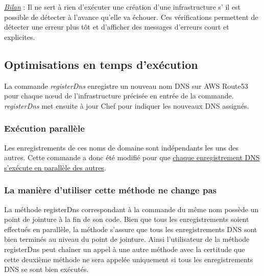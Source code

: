 \underline{\textit{Bilan}} :  Il ne sert à rien d'exécuter une création d'une
infrastructure s' il est possible de détecter à l'avance qu'elle va échouer.  
Ces vérifications permettent de détecter une erreur plus tôt et d'afficher des
messages d'erreurs court et explicites.





\subsection{Optimisations en temps d'exécution}

La commande \textit{registerDns} enregistre un nouveau nom DNS sur AWS Route53
pour chaque nœud de l'infrastructure précisée en entrée de la
commande. \textit{registerDns} met ensuite à jour Chef pour indiquer les
nouveaux DNS assignés.

\subsubsection{Exécution parallèle}

Les enregistrements de ces noms de domaine sont indépendants les uns des autres.
Cette commande a donc été modifié pour que \underline{chaque enregistrement DNS
  s'exécute en parallèle des autres}.

\subsubsection{La manière d'utiliser cette méthode ne change pas}

La méthode registerDns correspondant à la commande du même nom possède un point
de jointure à la fin de son code. Bien que tous les enregistrements soient
effectués en parallèle, la méthode s'assure que tous les enregistrements DNS
sont bien terminés au niveau du point de jointure. 
Ainsi l'utilisateur de la méthode registerDns peut chaîner un appel à une autre
méthode avec la certitude que cette deuxième méthode ne sera appelée uniquement
si tous les enregistrements DNS se sont bien exécutés.

